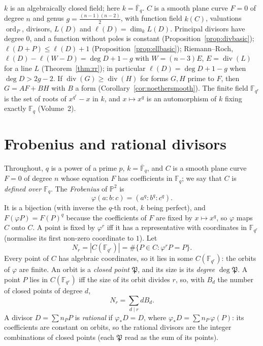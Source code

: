 \begin{reminder}
$k$ is an algebraically closed field; here $k=\overline{\mathbb F}_q$. $C$ is a smooth plane curve $F=0$ of degree $n$ and genus $g=\frac{(n-1)(n-2)}2$, with function
field $k(C)$, valuations $\operatorname{ord}_P$, divisors, $L(D)$ and $\ell(D)=\dim_kL(D)$. Principal divisors have degree $0$, and a function without poles is
constant (Proposition~\ref{prop:divbasic}); $\ell(D+P)\le\ell(D)+1$ (Proposition~\ref{prop:ellbasic}); Riemann--Roch, $\ell(D)-\ell(W-D)=\deg D+1-g$ with
$W=(n-3)E$, $E=\operatorname{div}(L)$ for a line $L$ (Theorem~\ref{thm:rr}); in particular $\ell(D)=\deg D+1-g$ when $\deg D>2g-2$. If $\operatorname{div}(G)\ge\operatorname{div}(H)$
for forms $G,H$ prime to $F$, then $G=AF+BH$ with $B$ a form (Corollary~\ref{cor:noethersmooth}). The finite field $\mathbb F_{q^r}$ is the set of roots of
$x^{q^r}-x$ in $k$, and $x\mapsto x^q$ is an automorphism of $k$ fixing exactly $\mathbb F_q$ (Volume~2).
\end{reminder}

\section{Frobenius and rational divisors}

Throughout, $q$ is a power of a prime $p$, $k=\overline{\mathbb F}_q$, and $C$ is a smooth plane curve $F=0$ of degree $n$ whose equation $F$ has coefficients in
$\mathbb F_q$; we say that $C$ is \emph{defined over $\mathbb F_q$}. The \emph{Frobenius} of $\mathbb P^2$ is
\[
\varphi(a:b:c)=(a^q:b^q:c^q).
\]
It is a bijection (with inverse the $q$-th root, $k$ being perfect), and $F(\varphi P)=F(P)^q$ because the coefficients of $F$ are fixed by $x\mapsto x^q$, so
$\varphi$ maps $C$ onto $C$. A point is fixed by $\varphi^r$ iff it has a representative with coordinates in $\mathbb F_{q^r}$ (normalise its first non-zero
coordinate to $1$). Let
\[
N_r=|C(\mathbb F_{q^r})|=\#\{P\in C:\varphi^rP=P\}.
\]
Every point of $C$ has algebraic coordinates, so it lies in some $C(\mathbb F_{q^r})$: the orbits of $\varphi$ are finite. An orbit is a \emph{closed point} $\mathfrak P$,
and its size is its \emph{degree} $\deg\mathfrak P$. A point $P$ lies in $C(\mathbb F_{q^r})$ iff the size of its orbit divides $r$, so, with $B_d$ the number of closed
points of degree $d$,
\begin{equation}\label{eq:NrBd}
N_r=\sum_{d\mid r}dB_d.
\end{equation}
A divisor $D=\sum n_PP$ is \emph{rational} if $\varphi_*D=D$, where $\varphi_*D=\sum n_P\,\varphi(P)$: its coefficients are constant on orbits, so the rational
divisors are the integer combinations of closed points (each $\mathfrak P$ read as the sum of its points).


